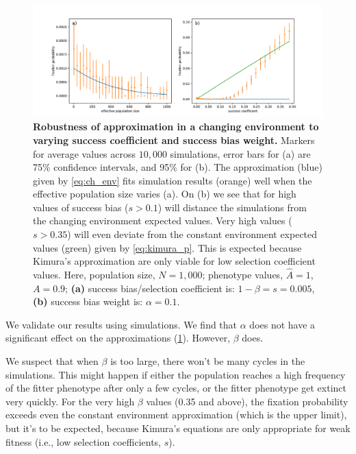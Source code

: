 \documentclass[12pt]{extarticle}
\begin{document}
\begin{figure}[h]
    \includegraphics[width=\linewidth]{../figures/changed_env/ch_env_var.pdf}
  \caption{\textbf{Robustness of approximation in a changing environment to varying success coefficient and success bias weight.}
 Markers for average values across $10,000$ simulations, error bars for (a) are 75\% confidence intervals, and 95\% for (b).
The approximation (blue) given by \cref{eq:ch_env} fits simulation results (orange) well when the effective population size varies (a).
On (b) we see that for high values of success bias ($s>0.1$) will distance the simulations from the changing environment expected values. Very high values ($s>0.35$) will even deviate from the constant environment expected values (green) given by \cref{eq:kimura_p}. This is expected because Kimura's approximation are only viable for low selection coefficient values.
  Here, population size, $N=1,000$; phenotype values, $\hat{A}=1$, $A=0.9$; \textbf{(a)} success bias/selection coefficient is: $1-\beta=s=0.005$, \textbf{(b)} success bias weight is: $\alpha=0.1$. 
  }
  \label{fig:ch_env_alpha_beta}
\end{figure}

We validate our results using simulations.
We find that $\alpha$ does not have a significant effect on the approximations (\cref{fig:ch_env_alpha_beta}).
However, $\beta$ does. 

We suspect that when $\beta$ is too large, there won't be many cycles in the simulations. This might happen if either the population reaches a high frequency of the fitter phenotype after only a few cycles, or the fitter phenotype get extinct very quickly. 
For the very high $\beta$ values (0.35 and above), the fixation probability exceeds even the constant environment approximation (which is the upper limit), but it's to be expected, because Kimura's equations are only appropriate for weak fitness (i.e., low selection coefficients, $s$).
\end{document}
